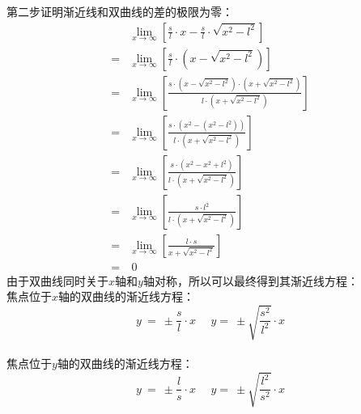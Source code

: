 \documentclass[UTF8]{ctexart}
\begin{document}
    第二步证明渐近线和双曲线的差的极限为零：\vspace{3pt}
    \begin{align}
        &\lim_{x\rightarrow \infty}\left[\frac{s}{l}\cdot x-\frac{s}{l}\cdot \sqrt{x^2-l^2}\right]\\[5mm]
        =&\lim_{x\rightarrow \infty}\left[\frac{s}{l}\cdot\left(x-\sqrt{x^2-l^2}\right)\right]\\[5mm]
        =&\lim_{x\rightarrow \infty}\left[\frac{s\cdot\left(x-\sqrt{x^2-l^2}\right)\cdot\left(x+\sqrt{x^2-l^2}\right)}{l\cdot\left(x+\sqrt{x^2-l^2}\right)}\right]\\[5mm]
        =&\lim_{x\rightarrow \infty}\left[\frac{s\cdot\left(x^2-\left(x^2-l^2\right)\right)}{l\cdot\left(x+\sqrt{x^2-l^2}\right)}\right]\\[5mm]
        =&\lim_{x\rightarrow \infty}\left[\frac{s\cdot\left(x^2-x^2+l^2\right)}{l\cdot\left(x+\sqrt{x^2-l^2}\right)}\right]\\[5mm]
        =&\lim_{x\rightarrow \infty}\left[\frac{s\cdot l^2}{l\cdot\left(x+\sqrt{x^2-l^2}\right)}\right]\\[5mm]
        =&\lim_{x\rightarrow \infty}\left[\frac{l\cdot s}{x+\sqrt{x^2-l^2}}\right]\\[5mm]
        =&~0
    \end{align}
    由于双曲线同时关于$x$轴和$y$轴对称，所以可以最终得到其渐近线方程：\\[3mm]
    焦点位于$x$轴的双曲线的渐近线方程：
    \begin{equation*}
        y~=~\pm \frac{s}{l}\cdot x~~~~~~y=~\pm \sqrt{\frac{s^2}{l^2}}\cdot x
    \end{equation*}\\
    焦点位于$y$轴的双曲线的渐近线方程：
    \begin{equation*}
        y~=~\pm \frac{l}{s}\cdot x~~~~~~y=~\pm \sqrt{\frac{l^2}{s^2}}\cdot x
    \end{equation*}\\

\newpage
\end{document}

